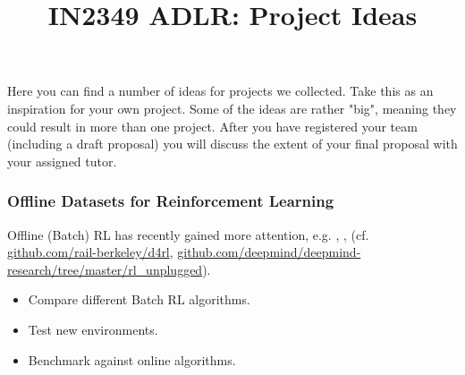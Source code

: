 \documentclass[a4paper]{article}
\title{IN2349 ADLR: Project Ideas}
\author{}
\begin{document}
\maketitle

Here you can find a number of ideas for projects we collected. 
Take this as an inspiration for your own project. 
Some of the ideas are rather "big", meaning they could result in more than one project. 
After you have registered your team (including a draft proposal) you will discuss the extent of your final proposal with your assigned tutor.



\subsubsection{Offline Datasets for Reinforcement Learning}
Offline (Batch) RL has recently gained more attention, e.g. \cite{Agarwal2019}, \cite{nair2020}, \cite{AWOpt2021} (cf. \url{github.com/rail-berkeley/d4rl}, \url{github.com/deepmind/deepmind-research/tree/master/rl_unplugged}).
\begin{itemize}
  \item Compare different Batch RL algorithms.
  \item Test new environments.
  \item Benchmark against online algorithms.
\end{itemize}
\end{document}
